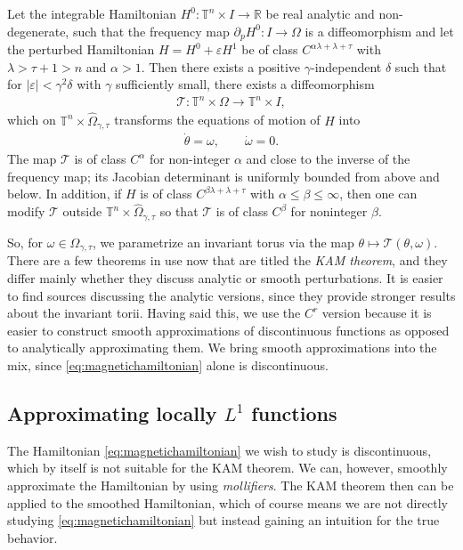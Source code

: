 \begin{theorem}\label{thm:KAM}
Let the integrable Hamiltonian $H^0:\mathbb T^n\times I\to\mathbb R$ be real analytic and non-degenerate, such that the frequency map $\partial_p H^0:I\to\Omega$ is a diffeomorphism and let the perturbed Hamiltonian $H=H^0+\varepsilon H^1$ be of class $C^{\alpha\lambda+\lambda+\tau}$ with $\lambda>\tau+1>n$ and $\alpha>1$. Then there exists a positive $\gamma$-independent $\delta$ such that for $|\varepsilon|<\gamma^2\delta$ with $\gamma$ sufficiently small, there exists a diffeomorphism
\begin{align*}
\mathcal T: \mathbb T^n\times\Omega \to\mathbb T^n\times I,
\end{align*} 
which on $\mathbb T^n\times\hat\Omega_{\gamma,\tau}$ transforms the equations of motion of $H$ into
\begin{align*}
\dot \theta=\omega,\qquad \dot\omega=0.
\end{align*}
The map $\mathcal T$ is of class $C^\alpha$ for non-integer $\alpha$ and close to the inverse of the frequency map; its Jacobian determinant is uniformly bounded from above and below. In addition, if $H$ is of class $C^{\beta\lambda+\lambda+\tau}$ with $\alpha\le\beta\le\infty$, then one can modify $\mathcal T$ outside $\mathbb T^n\times\hat\Omega_{\gamma,\tau}$ so that $\mathcal T$ is of class $C^\beta$ for noninteger $\beta$.
\end{theorem}

So, for $\omega\in\hat\Omega_{\gamma,\tau}$, we parametrize an invariant torus via the map $\theta\mapsto\mathcal T(\theta,\omega)$. There are a few theorems in use now that are titled the \textit{KAM theorem}, and they differ mainly whether they discuss analytic or smooth perturbations. It is easier to find sources discussing the analytic versions, since they provide stronger results about the invariant torii. Having said this, we use the $C^r$ version because it is easier to construct smooth approximations of discontinuous functions as opposed to analytically approximating them. We bring smooth approximations into the mix, since \eqref{eq:magnetichamiltonian} alone is discontinuous.

\subsection{Approximating locally $L^1$ functions}

The Hamiltonian \eqref{eq:magnetichamiltonian} we wish to study is discontinuous, which by itself is not suitable for the KAM theorem. We can, however, smoothly approximate the Hamiltonian by using \textit{mollifiers}. The KAM theorem then can be applied to the smoothed Hamiltonian, which of course means we are not directly studying \eqref{eq:magnetichamiltonian} but instead gaining an intuition for the true behavior.

